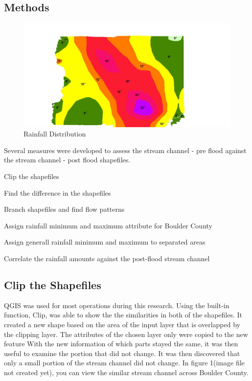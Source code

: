 \documentclass[twoside]{article}
\begin{document}
\begin{multicols}{2}
\section{Methods}

\begin{figure} %
\includegraphics[width=2\columnwidth]{project.jpg}
\caption{Rainfall Distribution\label{fig:sloth}}
\end{figure}

Several measures were developed to assess the stream channel - pre flood against the stream channel - post flood shapefiles.
\begin{compactitem}
\item Clip the shapefiles
\item Find the difference in the shapefiles
\item Branch shapefiles and find flow patterns
\item Assign rainfall minimum and maximum attribute for Boulder County
\item Assign generall rainfall minimum and maximum to separated areas
\item Correlate the rainfall amounts against the post-flood stream channel
\end{compactitem}
\subsection{Clip the Shapefiles}
QGIS was used for most operations during this research. Using the built-in function, Clip, was able to show the the similarities in both of the shapefiles. It created a new shape based on the area of the input layer that is overlapped by the clipping layer. The attributes of the chosen layer only were copied to the new feature With the new information of which parts stayed the same, it was then useful to examine the portion that did not change. It was then discovered that only a small portion of the stream channel did not change. In figure 1(image file not created yet), you can view the similar stream channel across Boulder County.


\end{multicols}
\end{document}
